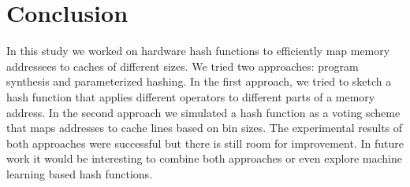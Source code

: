 \section{Conclusion}
\label{sec:Conclusion}

In this study we worked on hardware hash functions to efficiently map memory
addressees to caches of different sizes. We tried two approaches: program
synthesis and parameterized hashing. In the first approach, we tried to sketch a
hash function that applies different operators to different parts of a memory
address. In the second approach we simulated a hash function as a voting scheme
that maps addresses to cache lines based on bin sizes. The experimental results
of both approaches were successful but there is still room for improvement. In
future work it would be interesting to combine both approaches or even explore
machine learning based hash functions.
